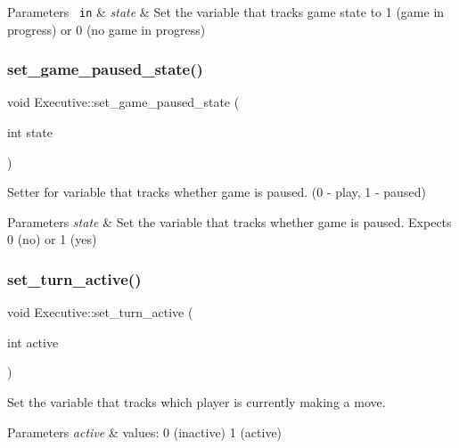 \begin{DoxyParams}[1]{Parameters}
\mbox{\texttt{ in}}  & {\em state} & Set the variable that tracks game state to 1 (game in progress) or 0 (no game in progress) \\
\hline
\end{DoxyParams}
\mbox{\label{classExecutive_a660154fa665ba56fda1279e48ad69486}} 
\subsubsection{\texorpdfstring{set\_game\_paused\_state()}{set\_game\_paused\_state()}}
{\footnotesize\ttfamily void Executive\+::set\+\_\+game\+\_\+paused\+\_\+state (\begin{DoxyParamCaption}\item[{int}]{state }\end{DoxyParamCaption})}



Setter for variable that tracks whether game is paused. (0 -\/ play, 1 -\/ paused) 


\begin{DoxyParams}{Parameters}
{\em state} & Set the variable that tracks whether game is paused. Expects 0 (no) or 1 (yes) \\
\hline
\end{DoxyParams}
\mbox{\label{classExecutive_a9000b97a47537ed955c9e40896829788}} 
\subsubsection{\texorpdfstring{set\_turn\_active()}{set\_turn\_active()}}
{\footnotesize\ttfamily void Executive\+::set\+\_\+turn\+\_\+active (\begin{DoxyParamCaption}\item[{int}]{active }\end{DoxyParamCaption})}



Set the variable that tracks which player is currently making a move. 


\begin{DoxyParams}{Parameters}
{\em active} & values\+: 0 (inactive) 1 (active) \\
\hline
\end{DoxyParams}
\mbox{\label{classExecutive_acf7839b1ac33deb79af36c654a7c5afa}} 
